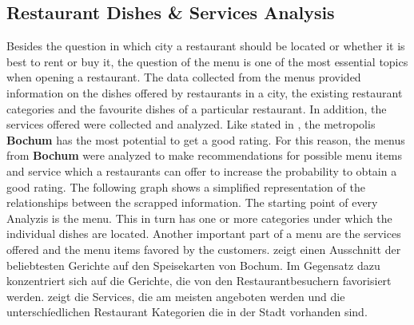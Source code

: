 \subsection{Restaurant Dishes \& Services Analysis}
\label{subsec:menu}
Besides the question in which city a restaurant should be located or whether it is best to rent or buy it,
the question of the menu is one of the most essential topics when opening a restaurant.
\newline
The data collected from the menus provided information on the dishes offered by restaurants in a city,
the existing restaurant categories and the favourite dishes of a particular restaurant.
In addition, the services offered were collected and analyzed.
\newline
Like stated in , the metropolis \textbf{Bochum} has the most potential to get a good rating.
For this reason, the menus from \textbf{Bochum} were analyzed to make recommendations for possible menu items and service which a restaurants can offer
to increase the probability to obtain a good rating.
\newline
The following graph shows a simplified representation of the relationships between the scrapped information.
The starting point of every Analyzis is the menu.
This in turn has one or more categories under which the individual dishes are located.
Another important part of a menu are the services offered and the menu items favored by the customers.
\newline
{} zeigt einen Ausschnitt der beliebtesten Gerichte auf den Speisekarten von Bochum.
Im Gegensatz dazu konzentriert sich  auf die Gerichte, die von den Restaurantbesuchern favorisiert werden.
 zeigt die Services, die am meisten angeboten werden und  die unterschíedlichen Restaurant Kategorien die in der Stadt vorhanden sind.
